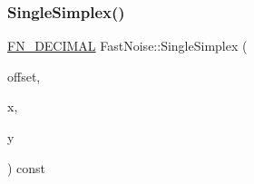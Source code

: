 \subsubsection{\texorpdfstring{Single\+Simplex()}{SingleSimplex()}\hspace{0.1cm}{\footnotesize\ttfamily [1/3]}}
{\footnotesize\ttfamily \mbox{\hyperlink{_fast_noise_8h_a75a9ef6d2541c4921815b885bfd449c3}{F\+N\+\_\+\+D\+E\+C\+I\+M\+AL}} Fast\+Noise\+::\+Single\+Simplex (\begin{DoxyParamCaption}\item[{unsigned char}]{offset,  }\item[{\mbox{\hyperlink{_fast_noise_8h_a75a9ef6d2541c4921815b885bfd449c3}{F\+N\+\_\+\+D\+E\+C\+I\+M\+AL}}}]{x,  }\item[{\mbox{\hyperlink{_fast_noise_8h_a75a9ef6d2541c4921815b885bfd449c3}{F\+N\+\_\+\+D\+E\+C\+I\+M\+AL}}}]{y }\end{DoxyParamCaption}) const\hspace{0.3cm}{\ttfamily [private]}}


